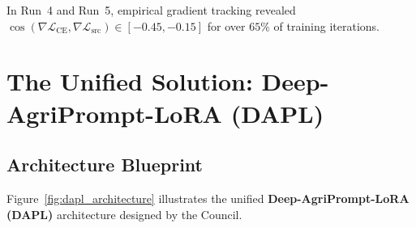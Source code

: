 \documentclass[letterpaper,11pt,leqno]{article}
\begin{document}
In Run~4 and Run~5, empirical gradient tracking revealed $\cos(\nabla \mathcal{L}_\mathrm{CE}, \nabla \mathcal{L}_\mathrm{src}) \in [-0.45, -0.15]$ for over $65\%$ of training iterations.

\newpage
\section{The Unified Solution: Deep-AgriPrompt-LoRA (DAPL)}

\subsection{Architecture Blueprint}

Figure~\ref{fig:dapl_architecture} illustrates the unified \textbf{Deep-AgriPrompt-LoRA (DAPL)} architecture designed by the Council.
\end{document}

